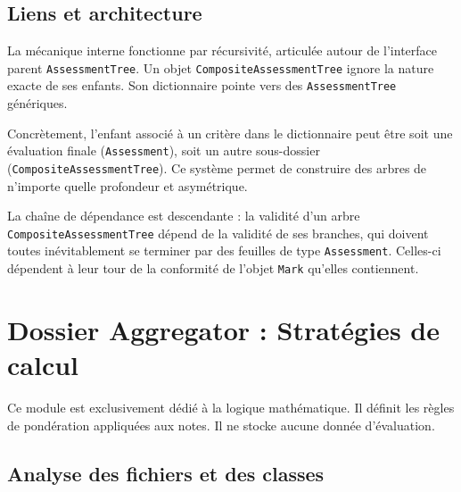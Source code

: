 \documentclass[11pt, a4paper]{article}
\begin{document}
\subsection{Liens et architecture}

La mécanique interne fonctionne par récursivité, articulée autour de l'interface parent \texttt{AssessmentTree}. Un objet \texttt{CompositeAssessmentTree} ignore la nature exacte de ses enfants. Son dictionnaire pointe vers des \texttt{AssessmentTree} génériques. 

Concrètement, l'enfant associé à un critère dans le dictionnaire peut être soit une évaluation finale (\texttt{Assessment}), soit un autre sous-dossier (\texttt{CompositeAssessmentTree}). Ce système permet de construire des arbres de n'importe quelle profondeur et asymétrique. 

La chaîne de dépendance est descendante : la validité d'un arbre \texttt{CompositeAssessmentTree} dépend de la validité de ses branches, qui doivent toutes inévitablement se terminer par des feuilles de type \texttt{Assessment}. Celles-ci dépendent à leur tour de la conformité de l'objet \texttt{Mark} qu'elles contiennent.


\section{Dossier Aggregator : Stratégies de calcul}

Ce module est exclusivement dédié à la logique mathématique. Il définit les règles de pondération appliquées aux notes. Il ne stocke aucune donnée d'évaluation.

\subsection{Analyse des fichiers et des classes}
\end{document}
